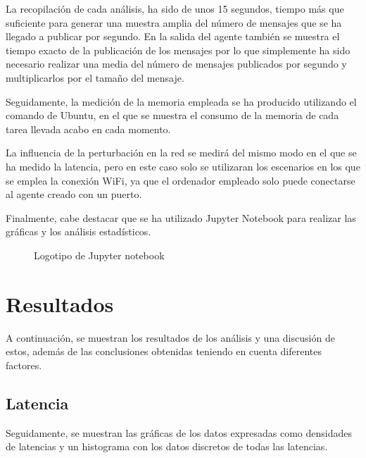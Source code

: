 \documentclass[a4paper,11pt,spanish]{sphinxmanual}
\let\sphinxpxdimen\pdfpxdimen\else\newdimen\sphinxpxdimen
\begin{document}
\sphinxAtStartPar
La recopilación de cada análisis, ha sido de unos 15 segundos, tiempo
más que suficiente para generar una muestra amplia del número de mensajes
que se ha llegado a publicar por segundo. En la salida
del agente también se muestra el tiempo exacto de la publicación de los
mensajes por lo que simplemente ha sido necesario realizar una media
del número de mensajes publicados por segundo y multiplicarlos por
el tamaño del mensaje.

\sphinxAtStartPar
Seguidamente, la medición de la memoria empleada se ha producido utilizando
el comando  de Ubuntu, en el que se muestra el consumo de la memoria
de cada tarea llevada acabo en cada momento.

\sphinxAtStartPar
La influencia de la perturbación en la red se medirá del mismo modo en el que
se ha medido la latencia, pero en este caso solo se utilizaran los escenarios
en los que se emplea la conexión Wi\sphinxhyphen{}Fi, ya que el ordenador empleado solo puede
conectarse al agente creado con un puerto.

\sphinxAtStartPar
Finalmente, cabe destacar que se ha utilizado Jupyter Notebook para
realizar las gráficas y los análisis estadísticos.

\begin{figure}[htbp]
\centering
\capstart

\noindent\sphinxincludegraphics[width=100\sphinxpxdimen]{{jupyter_notebook}.png}
\caption{Logotipo de Jupyter notebook}\label{\detokenize{dise_xf1o_del_analisis:id10}}\end{figure}

\sphinxAtStartPar



\chapter{Resultados}
\label{\detokenize{resultados:resultados}}\label{\detokenize{resultados::doc}}
\sphinxAtStartPar
A continuación, se muestran los resultados de los análisis y una
discusión de estos, además de las conclusiones obtenidas teniendo
en cuenta diferentes factores.


\section{Latencia}
\label{\detokenize{resultados:latencia}}
\sphinxAtStartPar
Seguidamente, se muestran las gráficas de los datos expresadas como densidades de
latencias y un histograma con los datos discretos de todas las latencias.
\end{document}
